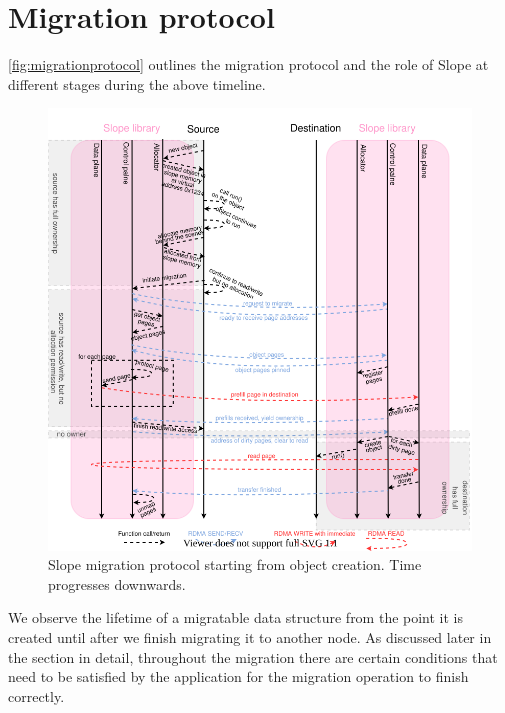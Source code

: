 

\section{Migration protocol}
\label{sec:migrationprotocol}

\autoref{fig:migrationprotocol} outlines the migration protocol and the role
of Slope at different stages during the above timeline.

\begin{figure}[tp]
\centering

\includegraphics[width=1\textwidth]{migration-protocol.drawio}
\caption{
    Slope migration protocol starting from object creation. Time progresses
    downwards.
}
\label{fig:migrationprotocol}
\end{figure}

We observe the lifetime of a migratable data structure from the point it is
created until after we finish migrating it to another node. As discussed
later in the section in detail, throughout the migration
there are certain conditions that need to be satisfied by the application
for the migration operation to finish correctly.

